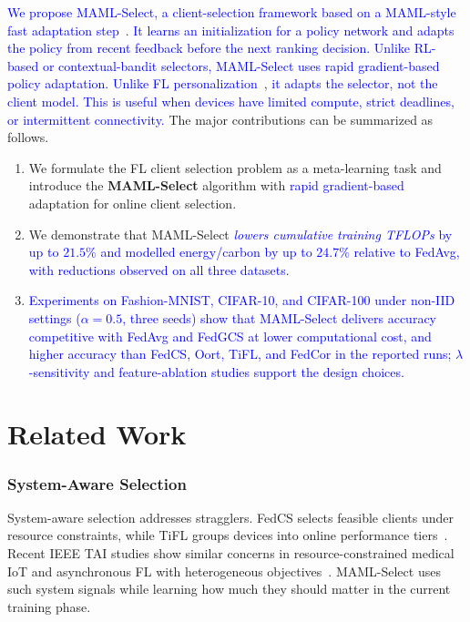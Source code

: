 \documentclass[journal]{IEEEtran}
\newcommand{\revision}[1]{\textcolor{blue}{#1}}
\begin{document}
\revision{We propose MAML-Select, a client-selection framework based on a MAML-style fast adaptation step}~\cite{finn2017model}. \revision{It learns an initialization for a policy network and adapts the policy from recent feedback before the next ranking decision. Unlike RL-based or contextual-bandit selectors, MAML-Select uses rapid gradient-based policy adaptation. Unlike FL personalization}~\cite{fallah2020personalized}, \revision{it adapts the selector, not the client model. This is useful when devices have limited compute, strict deadlines, or intermittent connectivity.} The major contributions can be summarized as follows.
\begin{enumerate}
\setlength{\itemsep}{0pt}
\setlength{\topsep}{1pt}
		\item We formulate the FL client selection problem as a meta-learning task and introduce the \textbf{MAML-Select} algorithm with \revision{rapid gradient-based} adaptation for online client selection.
		\item We demonstrate that MAML-Select \revision{\textit{lowers cumulative training TFLOPs} by up to $21.5\%$ and modelled energy/carbon by up to $24.7\%$ relative to FedAvg, with reductions observed on all three datasets}.
	\item \revision{Experiments on Fashion-MNIST, CIFAR-10, and CIFAR-100 under non-IID settings ($\alpha = 0.5$, three seeds) show that MAML-Select delivers accuracy competitive with FedAvg and FedGCS at lower computational cost, and higher accuracy than FedCS, Oort, TiFL, and FedCor in the reported runs; $\lambda$-sensitivity and feature-ablation studies support the design choices.}
\end{enumerate}

\section{Related Work}
\subsubsection{System-Aware Selection}
System-aware selection addresses stragglers. FedCS selects feasible clients under resource constraints, while TiFL groups devices into online performance tiers~\cite{nishio2019client,chai2020tifl}. Recent IEEE TAI studies show similar concerns in resource-constrained medical IoT and asynchronous FL with heterogeneous objectives~\cite{tapwal2026stragglers,forootani2026asynchronous}. MAML-Select uses such system signals while learning how much they should matter in the current training phase.
\end{document}
